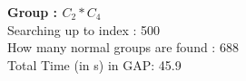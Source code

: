 \textbf{Group : $C_2*C_4$}\\
Searching up to index : 500\\
How many normal groups are found : 688\\
Total Time (in s) in GAP: 45.9\\
